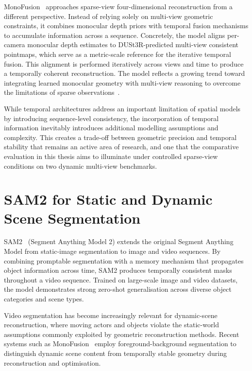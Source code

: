 MonoFusion~\cite{monofusion} approaches sparse-view four-dimensional reconstruction from a different perspective. Instead of relying solely on multi-view geometric constraints, it combines monocular depth priors with temporal fusion mechanisms to accumulate information across a sequence. Concretely, the model aligns per-camera monocular depth estimates to DUSt3R-predicted multi-view consistent pointmaps, which serve as a metric-scale reference for the iterative temporal fusion. This alignment is performed iteratively across views and time to produce a temporally coherent reconstruction. The model reflects a growing trend toward integrating learned monocular geometry with multi-view reasoning to overcome the limitations of sparse observations~\cite{li2025mono3rexploitingmonocularcues,Jiang_2025_ICCV,Cheng2025MonSterUS}.

While temporal architectures address an important limitation of spatial models by introducing sequence-level consistency, the incorporation of temporal information inevitably introduces additional modelling assumptions and complexity. This creates a trade-off between geometric precision and temporal stability that remains an active area of research, and one that the comparative evaluation in this thesis aims to illuminate under controlled sparse-view conditions on two dynamic multi-view benchmarks.

\section{SAM2 for Static and Dynamic Scene Segmentation}
\label{sec:sam2_background}

SAM2~\cite{sam2} (Segment Anything Model 2) extends the original Segment Anything Model from static-image segmentation to image and video sequences. By combining promptable segmentation with a memory mechanism that propagates object information across time, SAM2 produces temporally consistent masks throughout a video sequence. Trained on large-scale image and video datasets, the model demonstrates strong zero-shot generalisation across diverse object categories and scene types.

Video segmentation has become increasingly relevant for dynamic-scene reconstruction, where moving actors and objects violate the static-world assumptions commonly exploited by geometric reconstruction methods. Recent systems such as MonoFusion~\cite{monofusion} employ foreground-background segmentation to distinguish dynamic scene content from temporally stable geometry during reconstruction and optimisation.

